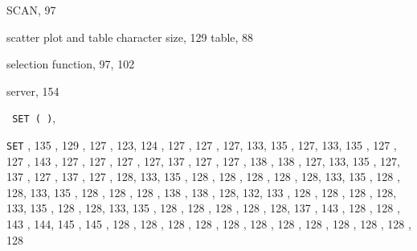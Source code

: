\begin{theindex}
  \item {\ttfamily  SCAN}, 97
  \item scatter plot
    \subitem and table character size, 129
    \subitem table, 88
  \item selection
    \subitem function, 97, 102
  \item server, 154
  \item \texttt  { SET{ \textrm {( )}}}, 
  \item {\tt SET}
    , 135
    , 129
    , 127
    , 123, 124
    , 127
    , 127
    , 127, 133, 135
    , 127, 133, 135
    , 127
    , 127
    , 143
    , 127
    , 127
    , 127
    , 127, 137
    , 127
    , 127
    , 138
    , 138
    , 127, 133, 135
    , 127, 137
    , 127
    , 137
    , 127
    , 128, 133, 135
    , 128
    , 128
    , 128
    , 128
    , 128, 133, 135
    , 128
    , 128, 133, 135
    , 128
    , 128
    , 128
    , 138
    , 138
    , 128, 132, 133
    , 128
    , 128
    , 128
    , 128, 133, 135
    , 128
    , 128, 133, 135
    , 128
    , 128
    , 128
    , 128
    , 128, 137
    , 143
    , 128
    , 128
    , 143
    , 144, 145
    , 145
    , 128
    , 128
    , 128
    , 128
    , 128
    , 128
    , 128
    , 128
    , 128
    , 128
    , 128
    , 128

\end{theindex}
